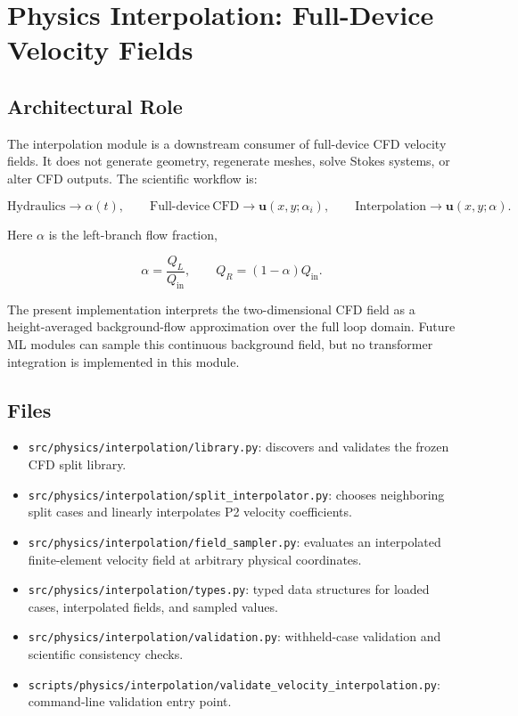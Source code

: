\section{Physics Interpolation: Full-Device Velocity Fields}

\subsection{Architectural Role}

The interpolation module is a downstream consumer of full-device CFD velocity
fields. It does not generate geometry, regenerate meshes, solve Stokes systems,
or alter CFD outputs. The scientific workflow is:

\[
\mathrm{Hydraulics}\rightarrow \alpha(t),
\qquad
\mathrm{Full\text{-}device~CFD}\rightarrow \mathbf{u}(x,y;\alpha_i),
\qquad
\mathrm{Interpolation}\rightarrow \mathbf{u}(x,y;\alpha).
\]

Here \(\alpha\) is the left-branch flow fraction,

\[
  \alpha = \frac{Q_L}{Q_{\mathrm{in}}},
  \qquad
  Q_R = (1-\alpha)Q_{\mathrm{in}}.
\]

The present implementation interprets the two-dimensional CFD field as a
height-averaged background-flow approximation over the full loop domain. Future
ML modules can sample this continuous background field, but no transformer
integration is implemented in this module.

\subsection{Files}

\begin{itemize}
  \item \texttt{src/physics/interpolation/library.py}: discovers and validates
        the frozen CFD split library.
  \item \texttt{src/physics/interpolation/split\_interpolator.py}: chooses
        neighboring split cases and linearly interpolates P2 velocity
        coefficients.
  \item \texttt{src/physics/interpolation/field\_sampler.py}: evaluates an
        interpolated finite-element velocity field at arbitrary physical
        coordinates.
  \item \texttt{src/physics/interpolation/types.py}: typed data structures for
        loaded cases, interpolated fields, and sampled values.
  \item \texttt{src/physics/interpolation/validation.py}: withheld-case
        validation and scientific consistency checks.
  \item \texttt{scripts/physics/interpolation/validate\_velocity\_interpolation.py}:
        command-line validation entry point.
\end{itemize}

